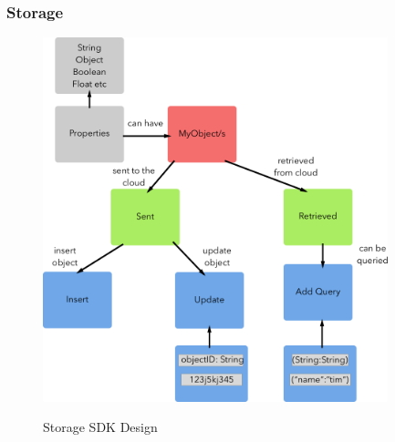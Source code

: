 \subsubsection{Storage} \label{d-sdk:storage}


\begin{figure}[!h]
    \caption{Storage SDK Design}
    \centering
    \includegraphics[width=100mm]{images/design/objects}
    \label{fig:sdk_storage}
\end{figure}

